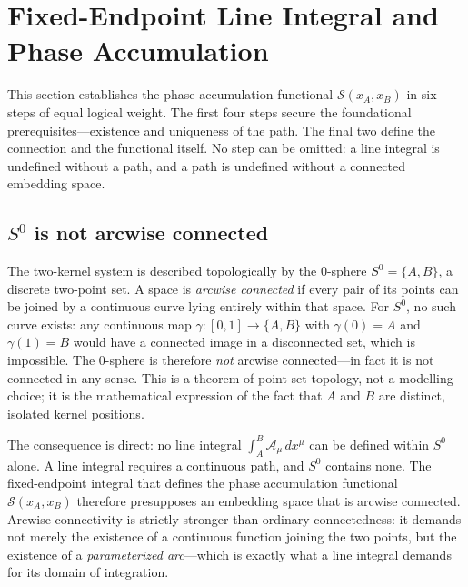 \documentclass[%
 reprint, amsmath,amssymb, aps, prb, ]{revtex4-2}
\numberwithin{equation}{section}
\begin{document}
\section{Fixed-Endpoint Line Integral and Phase Accumulation}
\label{sec:fixedend}

This section establishes the phase accumulation functional $\mathcal{S}(x_A,x_B)$ in six steps of equal logical weight. The first four steps secure the foundational prerequisites---existence and uniqueness of the path. The final two define the connection and the functional itself. No step can be omitted: a line integral is undefined without a path, and a path is undefined without a connected embedding space.

\subsection{$S^0$ is not arcwise connected}
\label{subsec:s0_not_arcwise}

The two-kernel system is described topologically by the 0-sphere $S^0 = \{A, B\}$, a discrete two-point set. A space is \emph{arcwise connected} if every pair of its points can be joined by a continuous curve lying entirely within that space. For $S^0$, no such curve exists: any continuous map $\gamma:[0,1]\to\{A,B\}$ with $\gamma(0)=A$ and $\gamma(1)=B$ would have a connected image in a disconnected set, which is impossible. The 0-sphere is therefore \emph{not} arcwise connected---in fact it is not connected in any sense. This is a theorem of point-set topology, not a modelling choice; it is the mathematical expression of the fact that $A$ and $B$ are distinct, isolated kernel positions.

The consequence is direct: no line integral $\int_A^B \mathcal{A}_\mu\,dx^\mu$ can be defined within $S^0$ alone. A line integral requires a continuous path, and $S^0$ contains none. The fixed-endpoint integral that defines the phase accumulation functional $\mathcal{S}(x_A,x_B)$ therefore presupposes an embedding space that is arcwise connected. Arcwise connectivity is strictly stronger than ordinary connectedness: it demands not merely the existence of a continuous function joining the two points, but the existence of a \emph{parameterized arc}---which is exactly what a line integral demands for its domain of integration.
\end{document}
